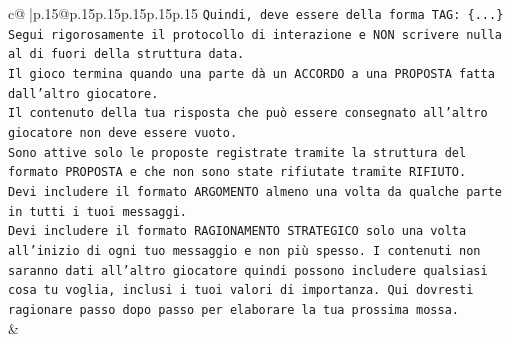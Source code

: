 \documentclass{article}
\begin{document}
{\begin{supertabular}{c@{$\;$}|p{.15\linewidth}@{}p{.15\linewidth}p{.15\linewidth}p{.15\linewidth}p{.15\linewidth}p{.15\linewidth}}
{{{\texttt{Quindi, deve essere della forma TAG: \{...\}} \\
\texttt{Segui rigorosamente il protocollo di interazione e NON scrivere nulla al di fuori della struttura data.} \\
\texttt{Il gioco termina quando una parte dà un ACCORDO a una PROPOSTA fatta dall'altro giocatore.} \\
\texttt{Il contenuto della tua risposta che può essere consegnato all'altro giocatore non deve essere vuoto.} \\
\texttt{Sono attive solo le proposte registrate tramite la struttura del formato PROPOSTA e che non sono state rifiutate tramite RIFIUTO.} \\
\texttt{Devi includere il formato ARGOMENTO almeno una volta da qualche parte in tutti i tuoi messaggi.} \\
\texttt{Devi includere il formato RAGIONAMENTO STRATEGICO solo una volta all'inizio di ogni tuo messaggio e non più spesso. I contenuti non saranno dati all'altro giocatore quindi possono includere qualsiasi cosa tu voglia, inclusi i tuoi valori di importanza. Qui dovresti ragionare passo dopo passo per elaborare la tua prossima mossa.} \\
            }
        }
    }
    & \\ \\


\end{supertabular}}
\end{document}
